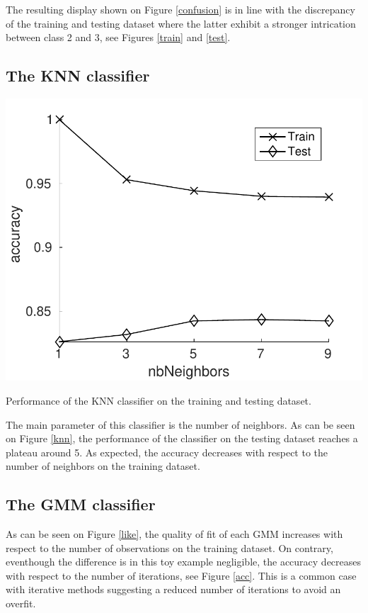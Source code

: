 \documentclass[12pt,a4paper,fleqn]{tufte-handout}
\begin{document}
The resulting display shown on Figure \ref{confusion} is in line with the discrepancy of the training and testing dataset where the latter exhibit a stronger intrication between class 2 and 3, see Figures \ref{train} and \ref{test}.

\subsection{The KNN classifier}


\begin{marginfigure}
\includegraphics[width=\textwidth]{figures/knn}
\caption{Performance of the KNN classifier on the training and testing dataset.}
\label{knn}
\end{marginfigure}



The main parameter of this classifier is the number of neighbors. As can be seen on Figure \ref{knn}, the performance of the classifier on the testing dataset reaches a plateau around 5. As expected, the accuracy decreases with respect to the number of neighbors on the training dataset.

\subsection{The GMM classifier}

As can be seen on Figure \ref{like}, the quality of fit of each GMM increases with respect to the number of observations on the training dataset. On contrary, eventhough the difference is in this toy example negligible, the accuracy decreases with respect to the number of iterations, see Figure \ref{acc}. This is a common case with iterative methods suggesting a reduced number of iterations to avoid an overfit.
\end{document}
